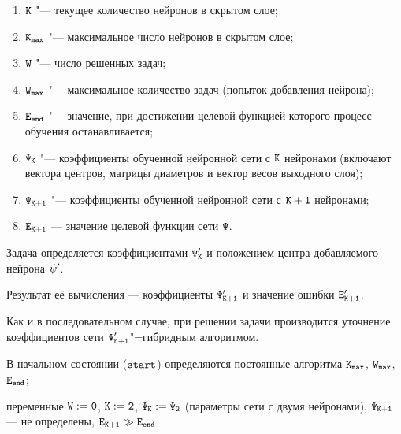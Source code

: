 \begin{enumerate}

\item $\tt K$ "--- текущее количество нейронов в скрытом слое;

\item $\tt K_{max}$ "--- максимальное число нейронов в скрытом слое;

\item $\tt W$ "--- число решенных задач;

\item $\tt W_{max}$ "--- максимальное количество задач (попыток добавления нейрона);

\item $\tt E_{end}$ "--- значение, при достижении целевой функцией которого процесс обучения останавливается;

\item $\tt \Psi_{K}$ "--- коэффициенты обученной нейронной сети с $\tt K$ нейронами (включают вектора центров, матрицы диаметров и вектор весов выходного слоя);

\item $\tt \Psi_{K+1}$ "--- коэффициенты обученной нейронной сети с $\tt K+1$ нейронами;

\item $\tt E_{K+1}$ --- значение целевой функции сети $\tt \Psi$.

\end{enumerate}



Задача определяется коэффициентами  $\tt \Psi'_{K}$ и положением центра добавляемого нейрона $\tt \psi'$. 

Результат её вычисления --- коэффициенты $\tt \Psi'_{K+1}$ и значение ошибки  $\tt E'_{K+1}$. 

Как и в последовательном случае, при решении задачи производится уточнение коэффициентов сети $\tt \Psi'_{n+1}$"=гибридным алгоритмом. 

В начальном состоянии ($\tt start$) определяются постоянные алгоритма $\tt K_{max}$, $\tt W_{max}$, $\tt E_{end}$; 

переменные $\tt W:=0$, $\tt K:=2$, $\tt \Psi_{K}:=\Psi_{2}$ (параметры сети с двумя нейронами), $\tt \Psi_{K+1}$ --- не определены, $\tt E_{K+1}\gg E_{end}$.







\smallskip



